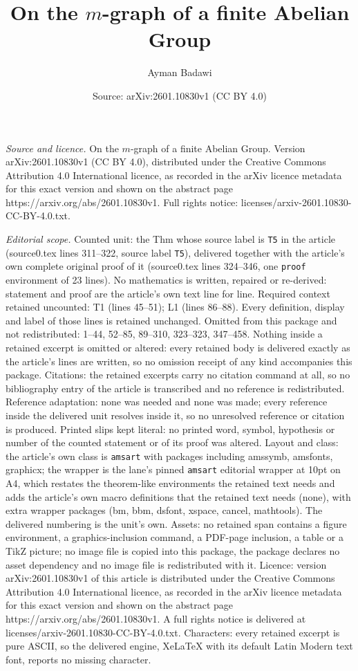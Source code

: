 \documentclass[10pt,a4paper]{amsart}
\title[On the $m$-graph of a finite Abelian Group]{On the $m$-graph of a finite Abelian Group}
\author{Ayman Badawi}
\date{Source: arXiv:2601.10830v1 (CC BY 4.0)}
\begin{document}
\maketitle

\noindent\emph{Source and licence.} On the $m$-graph of a finite Abelian Group. Version arXiv:2601.10830v1 (CC BY 4.0), distributed under the Creative Commons Attribution 4.0 International licence, as recorded in the arXiv licence metadata for this exact version and shown on the abstract page https://arxiv.org/abs/2601.10830v1. Full rights notice: licenses/arxiv-2601.10830-CC-BY-4.0.txt.\par\smallskip

\noindent\textit{Editorial scope.} Counted unit: the Thm whose source label is \texttt{T5} in the article (source0.tex lines 311--322, source label \texttt{T5}), delivered together with the article's own complete original proof of it (source0.tex lines 324--346, one \texttt{proof} environment of 23 lines). No mathematics is written, repaired or re-derived: statement and proof are the article's own text line for line. Required context retained uncounted: T1 (lines 45--51); L1 (lines 86--88). Every definition, display and label of those lines is retained unchanged. Omitted from this package and not redistributed: 1--44, 52--85, 89--310, 323--323, 347--458. Nothing inside a retained excerpt is omitted or altered: every retained body is delivered exactly as the article's lines are written, so no omission receipt of any kind accompanies this package. Citations: the retained excerpts carry no citation command at all, so no bibliography entry of the article is transcribed and no reference is redistributed. Reference adaptation: none was needed and none was made; every reference inside the delivered unit resolves inside it, so no unresolved reference or citation is produced. Printed slips kept literal: no printed word, symbol, hypothesis or number of the counted statement or of its proof was altered. Layout and class: the article's own class is \texttt{amsart} with packages including amssymb, amsfonts, graphicx; the wrapper is the lane's pinned \texttt{amsart} editorial wrapper at 10pt on A4, which restates the theorem-like environments the retained text needs and adds the article's own macro definitions that the retained text needs (none), with extra wrapper packages (bm, bbm, dsfont, xspace, cancel, mathtools). The delivered numbering is the unit's own. Assets: no retained span contains a figure environment, a graphics-inclusion command, a PDF-page inclusion, a table or a TikZ picture; no image file is copied into this package, the package declares no asset dependency and no image file is redistributed with it. Licence: version arXiv:2601.10830v1 of this article is distributed under the Creative Commons Attribution 4.0 International licence, as recorded in the arXiv licence metadata for this exact version and shown on the abstract page https://arxiv.org/abs/2601.10830v1. A full rights notice is delivered at licenses/arxiv-2601.10830-CC-BY-4.0.txt. Characters: every retained excerpt is pure ASCII, so the delivered engine, XeLaTeX with its default Latin Modern text font, reports no missing character.
\end{document}
